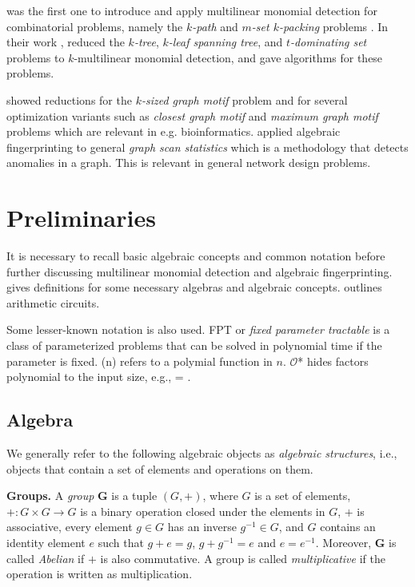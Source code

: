 \citeauthor{Koutis08} was the first one to introduce and apply multilinear monomial 
detection for combinatorial problems, namely the \emph{$k$-path} and \emph{$m$-set $k$-packing} problems 
\cite{Koutis08}. 
In their work \cite{KouWil09}, \citeauthor{KouWil09} reduced 
the \emph{$k$-tree}, \emph{$k$-leaf spanning tree}, and \emph{$t$-dominating set} problems 
to $k$-multilinear monomial detection, and 
gave  algorithms for these problems.  

\textcite{Björklund16} showed reductions for the 
\emph{$k$-sized graph motif} problem and for
several optimization variants such as \emph{closest graph motif} 
and \emph{maximum graph motif} problems which are relevant in e.g. bioinformatics. 
\textcite{Cadena17} 
applied algebraic fingerprinting to general \emph{graph scan statistics} 
which is a methodology that detects anomalies in a graph. This is relevant in 
general network design problems.

\section{Preliminaries}
\label{sect:prelims}

It is necessary to recall basic algebraic concepts and common notation 
before further discussing multilinear monomial detection and algebraic fingerprinting. 
 gives definitions for some necessary algebras 
and algebraic concepts.  outlines arithmetic circuits. 

Some lesser-known notation is also used. FPT or \emph{fixed parameter tractable} 
is a class of parameterized problems that 
can be solved in polynomial time if the parameter is fixed. 
\poly(n) refers to a polymial function in $n$. 
$\mathcal O$* hides factors polynomial to the input size, e.g., 
 = .

\subsection{Algebra} 
\label{sect:prelims_algebra}

We generally refer to the following algebraic objects 
as \emph{algebraic structures}, i.e., objects that contain a 
set of elements and operations on them.

\textbf{Groups.} A \emph{group} $\mathbf G$
is a tuple $(G, +)$, where $G$ is a set of elements, 
$+ \colon G \times G \to G$ 
is a binary operation closed under 
the elements in $G$, $+$ is associative, every element $g \in G$ 
has an inverse $g^{-1}\in G$, and $G$ contains 
an identity element $e$ such that $g + e = g$, $g + g^{-1} = e$ and $e = e^{-1}$. 
Moreover, $\mathbf G$ is called \emph{Abelian} if 
$+$ is also commutative. A group is called \emph{multiplicative} if the operation 
is written as multiplication.

